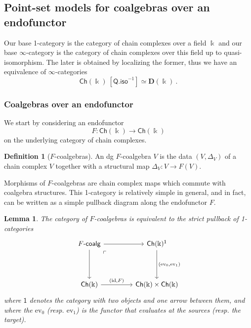 \documentclass{proc-l}
\theoremstyle{plain}
\newtheorem{lemma}[{theorem}]{Lemma}
\theoremstyle{definition}
\newtheorem{definition}[{theorem}]{Definition}
\theoremstyle{remark}
\newcommand{\kk}{\Bbbk}
\begin{document}
\subsection{Point-set models for coalgebras over an endofunctor}%
\label{Section:4.1}\label{Subsection: point-set models for coalgebras over endofunctors}
Our base 1-category is the category of chain complexes over a field $\kk$ and our base $\infty$-category is the category of chain complexes over this field up to quasi-isomorphism. The later is obtained by localizing the former, thus we have an equivalence of $\infty$-categories
\[
\mathsf{Ch}(\kk)~[\mathsf{Q.iso}^{-1}] \simeq \mathbf{D}(\kk)~.
\]

\subsubsection{Coalgebras over an endofunctor}%
\label{Section:4.1.1} We start by considering an endofunctor
\[
F: \mathsf{Ch}(\kk) \longrightarrow \mathsf{Ch}(\kk)
\]
on the underlying category of chain complexes.

\begin{definition}[{$F$-coalgebras}]%
\label{Definition:4.1}\label{definition: coalgebras over an endofunctor}
An dg $F$-coalgebra $V$ is the data $(V,\Delta_V)$ of a chain complex $V$ together with a structural map $\Delta_V: V \longrightarrow F(V)$.
\end{definition}

Morphisms of $F$-coalgebras are chain complex maps which commute with coalgebra structures. This 1-category is relatively simple in general, and in fact, can be written as a simple pullback diagram along the endofunctor $F$.

\begin{lemma}%
\label{Lemma:4.2}\label{lemma: 1-categorical coalgebras over an endofunctor as a pullback}
The category of $F$-coalgebras is equivalent to the strict pullback of 1-categories
\[
\begin{tikzcd}[column sep=3.5pc,row sep=3.5pc]
F\text{-}\mathsf{coalg} \arrow[r] \arrow[d] \arrow[dr, phantom, "\ulcorner", very near start]
& \mathsf{Ch}(\kk)^{\mathsf{1}} \arrow[d,"{(\mathrm{ev}_0,\mathrm{ev}_1)}"]  \\
\mathsf{Ch}(\kk) \arrow[r,"{(\mathrm{id},F)}"]
& \mathsf{Ch}(\kk) \times  \mathsf{Ch}(\kk)
\end{tikzcd}
\]
where $\mathsf{1}$ denotes the category with two objects and one arrow between them, and where the $\mathrm{ev}_0$ (resp. $\mathrm{ev}_1$) is the functor that evaluates at the sources (resp. the target).
\end{lemma}
\end{document}
